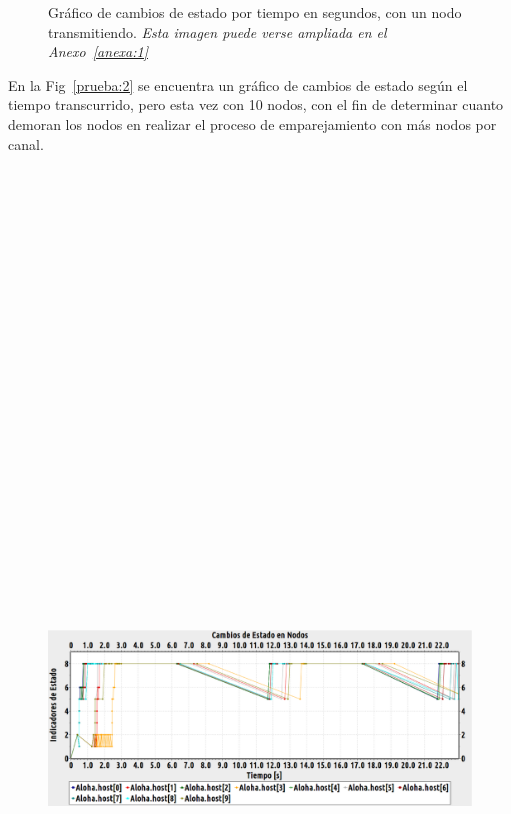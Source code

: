 \begin{justify}
\begin{figure}[!ht]
\caption{Gráfico de cambios de estado por tiempo en segundos, con un nodo transmitiendo. \textit{Esta imagen puede verse ampliada en el Anexo~\ref{anexa:1}}}
\label{prueba:1}
\end{figure}
En la Fig~\ref{prueba:2} se encuentra un gráfico de cambios de estado según el tiempo transcurrido, pero esta vez con 10 nodos, con el fin de determinar cuanto demoran los nodos en realizar el proceso de emparejamiento con más nodos por canal.\\
\begin{figure}[!ht]
\centering
\includegraphics[width=13cm,height=30cm,keepaspectratio]{images/cambioestado10nodos.eps}

\end{figure}
\end{justify}
